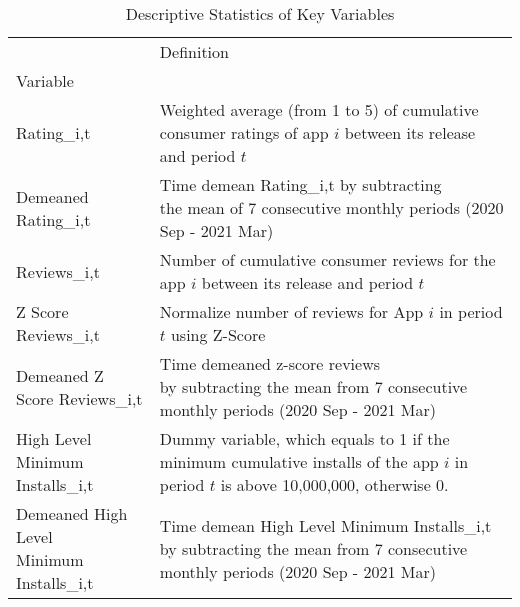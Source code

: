 \begin{table}[h!]
\centering
\caption{Descriptive Statistics of Key Variables}
\label{table:1}
\begin{tabular}{ll}
\toprule
{} &                                                                                                                                                            Definition \\
Variable                                                      &                                                                                                                                                                       \\
\midrule
Rating_{i,t}                                                  &  \makecell[l]{Weighted average (from 1 to 5) of \\ cumulative consumer ratings of app $i$ \\ between its release and period $t$} \\
Demeaned Rating_{i,t}                                         &  \makecell[l]{Time demean Rating_{i,t} by subtracting \\ the mean of 7 consecutive monthly periods (2020 Sep - 2021 Mar)} \\
Reviews_{i,t}                                                 &  \makecell[l]{Number of cumulative consumer reviews \\ for the app $i$ between its release and period $t$} \\
Z Score Reviews_{i,t}                                         &  Normalize number of reviews for App $i$ in period $t$ using Z-Score \\
Demeaned Z Score Reviews_{i,t}                                &  \makecell[l]{Time demeaned z-score reviews \\ by subtracting the mean from 7 consecutive \\ monthly periods (2020 Sep - 2021 Mar)} \\
\makecell[l]{High Level \\ Minimum Installs_{i,t}}            &  \makecell[l]{Dummy variable, which equals to 1 if \\ the minimum cumulative installs of the app $i$ in \\ period $t$ is above 10,000,000, otherwise 0.} \\
\makecell[l]{Demeaned High Level \\ Minimum Installs_{i,t}}   &  \makecell[l]{Time demean High Level Minimum Installs_{i,t} \\ by subtracting the mean from 7 consecutive \\ monthly periods (2020 Sep - 2021 Mar)} \\

\end{tabular}
\end{table}
